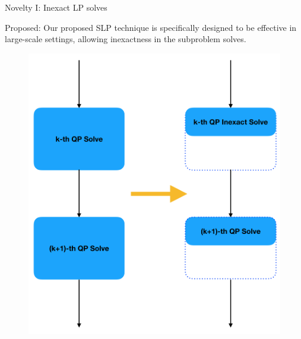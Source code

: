 \documentclass[8pt]{beamer}
\begin{document}
\begin{frame}[c]{Novelty I: Inexact LP solves}

\vfill 

{\red  \leftpointright Proposed: } 
Our proposed SLP technique is specifically designed to be effective in large-scale settings, allowing {\red inexactness} in the subproblem solves. 

\vfill

\begin{figure}[H]
\includegraphics[scale=0.15]{pic/inexact}
\end{figure}
\end{frame}
\end{document}
